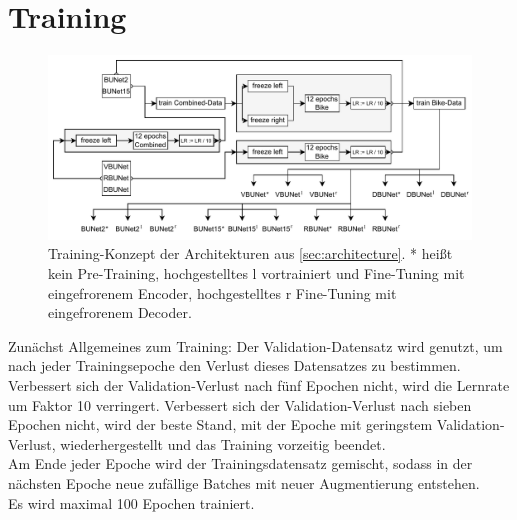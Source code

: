\section{Training} \label{sec:training}

\begin{figure}
	\centering
	\includegraphics[width=1.\textwidth]{Bilder/training-concept.drawio.pdf} 
	\caption{Training-Konzept der Architekturen aus \autoref{sec:architecture}. * heißt kein Pre-Training,
	hochgestelltes l vortrainiert und Fine-Tuning mit eingefrorenem Encoder, hochgestelltes r Fine-Tuning mit eingefrorenem Decoder.}
	\label{fig:training}
\end{figure} 

Zunächst Allgemeines zum Training:
Der Validation-Datensatz wird genutzt, um nach jeder Trainingsepoche den Verlust dieses Datensatzes zu bestimmen. 
Verbessert sich der Validation-Verlust nach fünf Epochen nicht, wird die Lernrate um Faktor 10 verringert. 
Verbessert sich der Validation-Verlust nach sieben Epochen nicht, wird der beste Stand, mit der Epoche mit geringstem 
Validation-Verlust, wiederhergestellt und das Training vorzeitig beendet.  \\
Am Ende jeder Epoche wird der Trainingsdatensatz gemischt, sodass in der nächsten Epoche neue zufällige 
Batches mit neuer Augmentierung entstehen. \\
Es wird maximal 100 Epochen trainiert.

